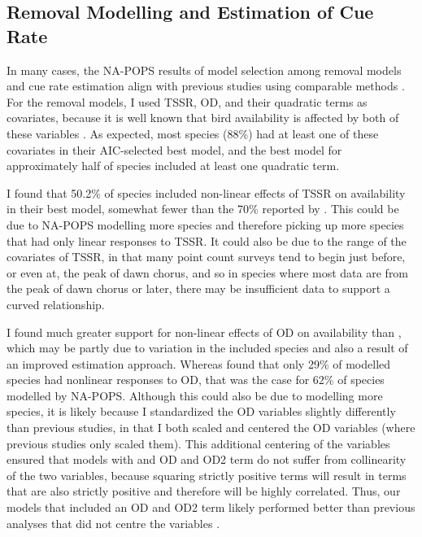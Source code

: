 \subsection{Removal Modelling and Estimation of Cue Rate}

\par In many cases, the NA-POPS results of model selection among removal models and cue rate estimation align with previous studies using comparable methods \citep{solymos_calibrating_2013, solymos_evaluating_2018}. For the removal models, I used TSSR, OD, and their quadratic terms as covariates, because it is well known that bird availability is affected by both of these variables \citep{wilson_reliability_1985}. As expected, most species (88\%) had at least one of these covariates in their AIC-selected best model, and the best model for approximately half of species included at least one quadratic term. 

\par I found that 50.2\% of species included non-linear effects of TSSR on availability in their best model, somewhat fewer than the 70\% reported by \citet{solymos_evaluating_2018}. This could be due to NA-POPS modelling more species and therefore picking up more species that had only linear responses to TSSR. It could also be due to the range of the covariates of TSSR, in that many point count surveys tend to begin just before, or even at, the peak of dawn chorus, and so in species where most data are from the peak of dawn chorus or later, there may be insufficient data to support a curved relationship.

\par I found much greater support for non-linear effects of OD on availability than \citet{solymos_evaluating_2018}, which may be partly due to variation in the included species and also a result of an improved estimation approach. Whereas \citet{solymos_evaluating_2018} found that only 29\% of modelled species had nonlinear responses to OD, that was the case for 62\% of species modelled by NA-POPS. Although this could also be due to modelling more species, it is likely because I standardized the OD variables slightly differently than previous studies, in that I both scaled and centered the OD variables (where previous studies only scaled them). This additional centering of the variables ensured that models with and OD and OD2 term do not suffer from collinearity of the two variables, because squaring strictly positive terms will result in terms that are also strictly positive and therefore will be highly correlated. Thus, our models that included an OD and OD2 term likely performed better than previous analyses that did not centre the variables \citep{solymos_calibrating_2013, solymos_evaluating_2018}. 

